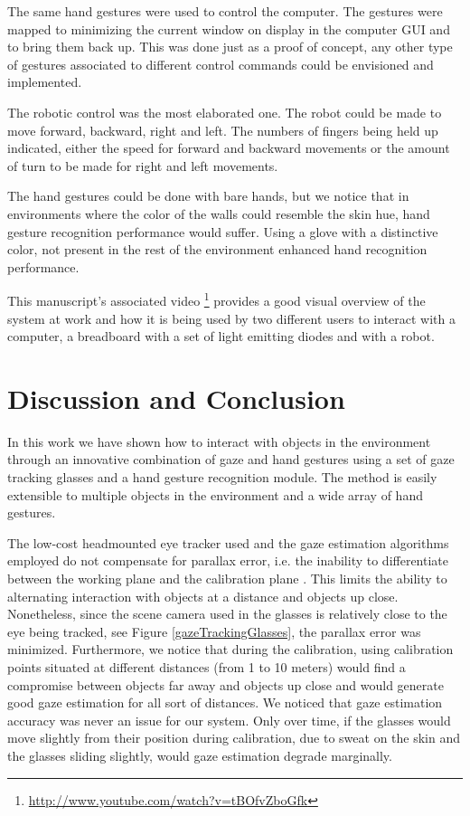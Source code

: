 \documentclass[jou,a4paper,notxfonts]{apa}
\begin{document}
The same hand gestures were used to control the computer. The gestures were mapped to minimizing the current window on
display in the computer GUI and to bring them back up. This was done just as a proof of concept, any other type of
gestures associated to different control commands could be envisioned and implemented.

The robotic control was the most elaborated one. The robot could be made to move forward, backward, right and left. The
numbers of fingers being held up indicated, either the speed for forward and backward movements or the amount of turn to
be made for right and left movements.

The hand gestures could be done with bare hands, but we notice that in environments where the color of the walls could
resemble the skin hue, hand gesture recognition performance would suffer. Using a glove with a distinctive color, not 
present in the rest of the environment enhanced hand recognition performance.

This manuscript's associated video \footnote{\url{http://www.youtube.com/watch?v=tBOfvZboGfk}} provides a good visual
overview of the system at work and how it is being used by two different users to interact with a computer, a breadboard
with a set of light emitting diodes and with a robot.


\section{Discussion and Conclusion}
In this work we have shown how to interact with objects in the environment through an innovative combination of gaze and
hand gestures using a set of gaze tracking glasses and a hand gesture recognition module. The method is easily
extensible to multiple objects in the environment and a wide array of hand gestures.

The low-cost headmounted eye tracker used and the gaze estimation algorithms employed do not compensate for parallax
error, i.e. the inability to differentiate between the working plane and the calibration plane
\cite{mardanbegi2012parallax}. This limits the ability to alternating interaction with objects at a distance and objects
up close. Nonetheless, since the scene camera used in the glasses is relatively close to the eye being tracked, see Figure
\ref{gazeTrackingGlasses}, the parallax error was minimized. Furthermore, we notice that during the calibration, using
calibration points situated at different distances (from 1 to 10 meters) would find a compromise between objects
far away and objects up close and would generate good gaze estimation for all sort of distances. We noticed that
gaze estimation accuracy was never an issue for our system. Only over time, if the glasses would move slightly from
their position during calibration, due to sweat on the skin and the glasses sliding slightly, would gaze
estimation degrade marginally.
\end{document}
